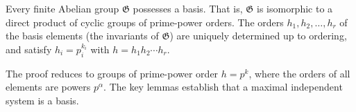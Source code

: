 Every finite Abelian group $\mathfrak{G}$ possesses a basis. That is, $\mathfrak{G}$ is isomorphic to a direct product of cyclic groups of prime-power orders. The orders $h_1, h_2, \ldots, h_r$ of the basis elements (the invariants of $\mathfrak{G}$) are uniquely determined up to ordering, and satisfy $h_i = p_i^{k_i}$ with $h = h_1 h_2 \cdots h_r$.

The proof reduces to groups of prime-power order $h = p^k$, where the orders of all elements are powers $p^\alpha$. The key lemmas establish that a maximal independent system is a basis.

